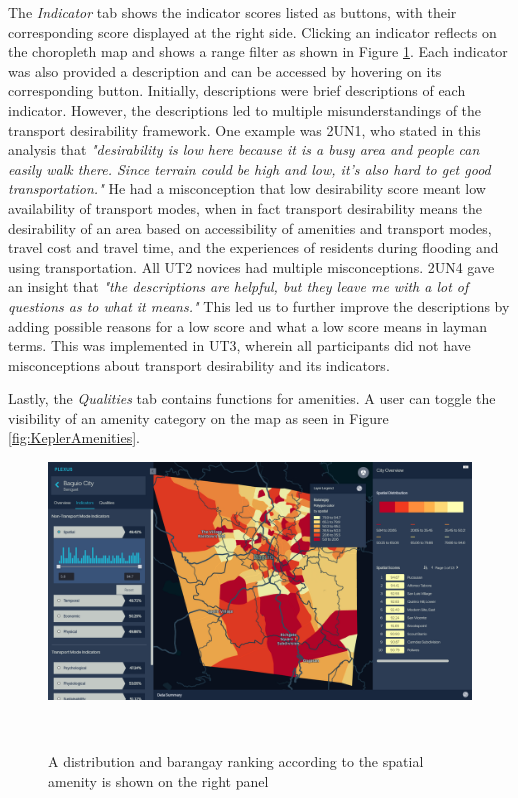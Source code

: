 \documentclass{sigchi}
\begin{document}
The \textit{Indicator} tab shows the indicator scores listed as buttons, with their corresponding score displayed at the right side. Clicking an indicator reflects on the choropleth map and shows a range filter as shown in Figure \ref{fig:KeplerIndicatorActive}. Each indicator was also provided a description and can be accessed by hovering on its corresponding button. Initially, descriptions were brief descriptions of each indicator. However, the descriptions led to multiple misunderstandings of the transport desirability framework. One example was 2UN1, who stated in this analysis that \textit{"desirability is low here because it is a busy area and people can easily walk there. Since terrain could be high and low, it's also hard to get good transportation."} He had a misconception that low desirability score meant low availability of transport modes, when in fact transport desirability means the desirability of an area based on accessibility of amenities and transport modes, travel cost and travel time, and the experiences of residents during flooding and using transportation. All UT2 novices had multiple misconceptions. 2UN4 gave an insight that \textit{"the descriptions are helpful, but they leave me with a lot of questions as to what it means."} This led us to further improve the descriptions by adding possible reasons for a low score and what a low score means in layman terms. This was implemented in UT3, wherein all participants did not have misconceptions about transport desirability and its indicators. 

Lastly, the \textit{Qualities} tab contains functions for amenities. A user can toggle the visibility of an amenity category on the map as seen in Figure \ref{fig:KeplerAmenities}.

\begin{figure}
\centering
  \includegraphics[width=0.9\columnwidth]{figures/indicator.PNG}
  \caption{A distribution and barangay ranking according to the spatial amenity is shown on the right panel}~\label{fig:KeplerIndicatorActive}
\end{figure}
\end{document}

